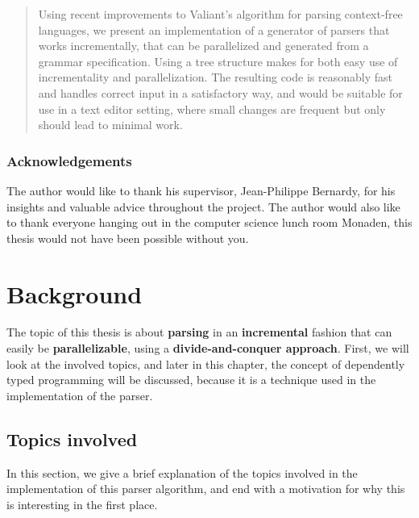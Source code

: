 \documentclass[a4paper,12pt,twosided]{report}
\begin{document}


\begin{abstract}
Using recent improvements to Valiant's algorithm for parsing context-free
languages, we present an implementation of a generator of parsers that works
incrementally, that can be parallelized and generated from a grammar
specification. Using a tree structure makes for both easy use of incrementality
and parallelization.  The resulting code is reasonably fast and handles correct
input in a satisfactory way, and would be suitable for use in a text editor
setting, where small changes are frequent but only should lead to minimal work.
\end{abstract}

\thispagestyle{empty}
\subsection*{Acknowledgements}
The author would like to thank his supervisor, Jean-Philippe Bernardy, for his
insights and valuable advice throughout the project. The author would also like
to thank everyone hanging out in the computer science lunch room Monaden, this
thesis would not have been possible without you. 

\setcounter{page}{0}
\tableofcontents

%
%

\chapter{Background}
The topic of this thesis is about \textbf{parsing} in an \textbf{incremental}
fashion that can easily be \textbf{parallelizable}, using a
\textbf{divide-and-conquer approach}. First, we will look at the involved
topics, and later in this chapter, the concept of dependently typed programming
will be discussed, because it is a technique used in the implementation of the
parser.

\section{Topics involved}
In this section, we give a brief explanation of the topics involved in the
implementation of this parser algorithm, and end with a motivation for why this
is interesting in the first place. 
\end{document}
